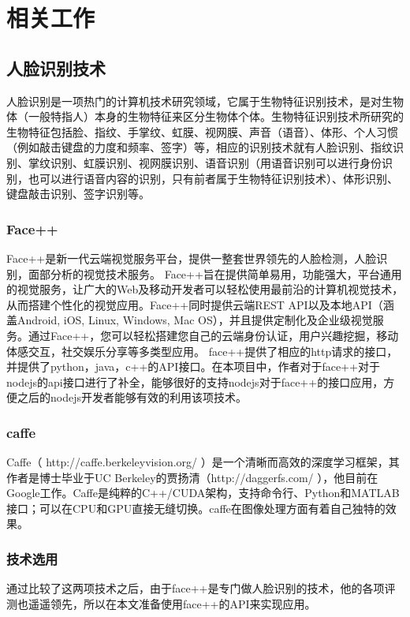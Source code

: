 
\chapter{相关工作}


\section{人脸识别技术}
人脸识别是一项热门的计算机技术研究领域，它属于生物特征识别技术，是对生物体（一般特指人）本身的生物特征来区分生物体个体。生物特征识别技术所研究的生物特征包括脸、指纹、手掌纹、虹膜、视网膜、声音（语音）、体形、个人习惯（例如敲击键盘的力度和频率、签字）等，相应的识别技术就有人脸识别、指纹识别、掌纹识别、虹膜识别、视网膜识别、语音识别（用语音识别可以进行身份识别，也可以进行语音内容的识别，只有前者属于生物特征识别技术）、体形识别、键盘敲击识别、签字识别等。
\subsection{Face++}
Face++是新一代云端视觉服务平台，提供一整套世界领先的人脸检测，人脸识别，面部分析的视觉技术服务。
Face++旨在提供简单易用，功能强大，平台通用的视觉服务，让广大的Web及移动开发者可以轻松使用最前沿的计算机视觉技术，从而搭建个性化的视觉应用。Face++同时提供云端REST API以及本地API（涵盖Android, iOS, Linux, Windows, Mac OS），并且提供定制化及企业级视觉服务。通过Face++，您可以轻松搭建您自己的云端身份认证，用户兴趣挖掘，移动体感交互，社交娱乐分享等多类型应用。
face++提供了相应的http请求的接口，并提供了python，java，c++的API接口。在本项目中，作者对于face++对于nodejs的api接口进行了补全，能够很好的支持nodejs对于face++的接口应用，方便之后的nodejs开发者能够有效的利用该项技术。

\subsection{caffe}
Caffe（ http://caffe.berkeleyvision.org/ ）是一个清晰而高效的深度学习框架，其作者是博士毕业于UC Berkeley的贾扬清（http://daggerfs.com/ ），他目前在Google工作。Caffe是纯粹的C++/CUDA架构，支持命令行、Python和MATLAB接口；可以在CPU和GPU直接无缝切换。caffe在图像处理方面有着自己独特的效果。

\subsection{技术选用}
通过比较了这两项技术之后，由于face++是专门做人脸识别的技术，他的各项评测也遥遥领先，所以在本文准备使用face++的API来实现应用。


